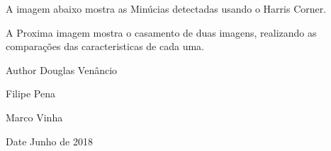 \begin{DoxyItemize}
\item A imagem abaixo mostra as Minúcias detectadas usando o Harris Corner.
\end{DoxyItemize}




\begin{DoxyItemize}
\item A Proxima imagem mostra o casamento de duas imagens, realizando as comparações das caracteristicas de cada uma.
\end{DoxyItemize}



\begin{DoxyAuthor}{Author}
Douglas Venâncio 

Filipe Pena 

Marco Vinha 
\end{DoxyAuthor}
\begin{DoxyDate}{Date}
Junho de 2018 
\end{DoxyDate}
